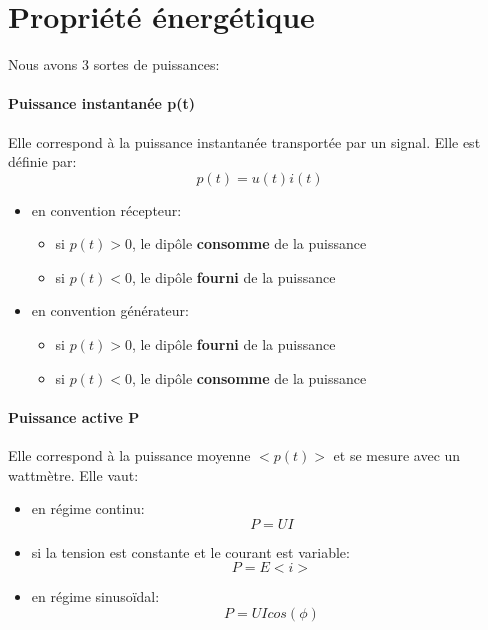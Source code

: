 \documentclass[12pt,a4paper,openany]{book}
\begin{document}
\section{Propriété énergétique}

Nous avons 3 sortes de puissances:

\paragraph{Puissance instantanée p(t)} Elle correspond à la puissance instantanée transportée par un signal. Elle est définie par:
\begin{equation}
p(t) = u(t)i(t)
\end{equation}

\begin{itemize}
\item en convention récepteur:
\begin{itemize}
\item si $ p(t)>0 $, le dipôle \textbf{consomme} de la puissance
\item si $ p(t)<0 $, le dipôle \textbf{fourni} de la puissance
\end{itemize}
\item en convention générateur:
\begin{itemize}
\item si $ p(t)>0 $, le dipôle \textbf{fourni} de la puissance
\item si $ p(t)<0 $, le dipôle \textbf{consomme} de la puissance
\end{itemize}
\end{itemize}

\paragraph{Puissance active P} Elle correspond à la puissance moyenne $ <p(t)> $ et se mesure avec un wattmètre. Elle vaut:
\begin{itemize}
\item en régime continu:
\begin{equation}
P = UI
\end{equation}
\item si la tension est constante et le courant est variable:
\begin{equation}
P = E<i>
\end{equation}
\item en régime sinusoïdal:
\begin{equation}
P = UIcos(\phi)
\end{equation}
\end{itemize}
\end{document}
